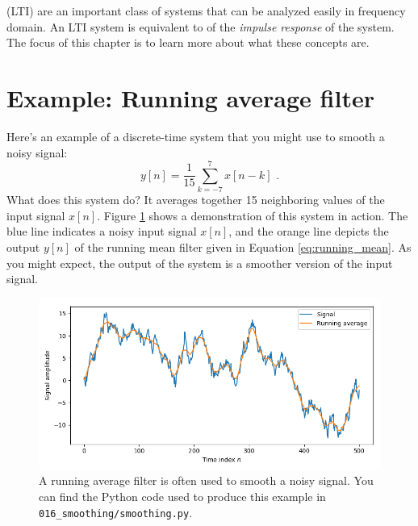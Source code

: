 (LTI) are an important class of systems that can be analyzed easily in frequency domain.
An LTI system is equivalent to \emph{} of the \emph{impulse response} of the system.
The focus of this chapter is to learn more about what these concepts are.

\section{Example: Running average filter}
Here's an example of a discrete-time system that you might use to smooth a noisy signal:
\begin{equation}
  y[n] = \frac{1}{15}\sum_{k=-7}^{7} x[n-k]\,\,.
  \label{eq:running_mean}
\end{equation}
What does this system do? It averages together 15 neighboring values of the input signal $x[n]$.
Figure \ref{fig:avg_filter} shows a demonstration of this system in action.
The blue line indicates a noisy input signal $x[n]$, and the orange line depicts the output
$y[n]$ of the running mean filter given in Equation \ref{eq:running_mean}.
As you might expect, the output of the system is a smoother version of the input signal.
\begin{figure}
  \begin{center}
    \includegraphics[width=\textwidth]{code/016_smoothing/smoothing.png}
  \end{center}
  \caption{A running average filter is often used to smooth a noisy
    signal. You can find the Python code used to produce this example
    in \texttt{016\_smoothing/smoothing.py}.}
  \label{fig:avg_filter}
\end{figure}

